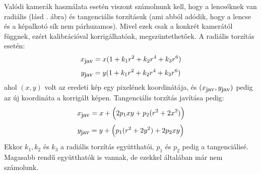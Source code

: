 Valódi kamerák használata esetén viszont számolnunk kell, hogy a lencséknek van radiális (lásd . ábra) és tangenciális torzításuk (ami abból adódik, hogy a lencse és a képalkotó sík nem párhuzamos). Mivel ezek csak a konkrét kamerától függnek, ezért kalibrációval korrigálhatóak, megszüntethetőek. A radiális torzítás esetén:
\[x_{\hbox{\small jav}} = x(1 + k_1r^2 + k_2r^4 + k_3r^6)\]
\[y_{\hbox{\small jav}} = y(1 + k_1r^2 + k_2r^4 + k_3r^6)\]
ahol $(x,y)$ volt az eredeti kép egy pixelének koordinátája, és $(x_{\hbox{\small jav}}, y_{\hbox{\small jav}})$ pedig az új koordináta a korrigált képen. Tangenciális torzítás javítása pedig:
\[x_{\hbox{\small jav}} = x + \Big(2p_1xy + p_2(r^2+2x^2)\Big)\]
\[y_{\hbox{\small jav}} = y + \Big(p_1(r^2+2y^2) + 2p_2xy\Big)\]
Ekkor $k_1, k_2$ és $k_3$ a radiális torzítás együtthatói, $p_1$ és $p_2$ pedig a tangenciálisé. Magasabb rendű együtthatók is vannak, de ezekkel általában már nem számolunk.
